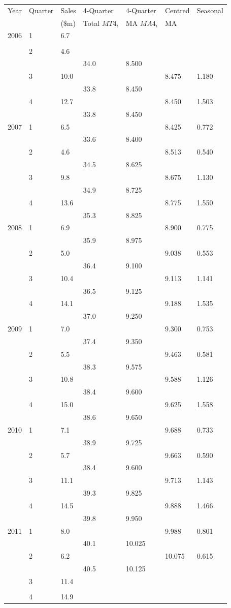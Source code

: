 \documentclass[12pt,a4paper,openany,twoside]{report}
\theoremstyle{definition}
\theoremstyle{remark}
\theoremstyle{plain}
\newcommand{\vsps}{\vspace{.5cm}}
\theoremstyle{definition}
\theoremstyle{definition}
\theoremstyle{definition}
\theoremstyle{remark}
\begin{document}
\begin{longtable}[c]{@{}lllllll@{}}
\label{tb:toys}\\
\toprule
Year & Quarter & Sales & 4-Quarter & 4-Quarter & Centred & Seasonal \tabularnewline
 &  & (\$m) & Total $MT4_i$ & MA $MA4_i$ & MA &  \tabularnewline
\midrule
\endhead
\rowcolor{lightgrey}
2006 & 1 & 6.7 & & & &\tabularnewline
& & & & & &\tabularnewline
\rowcolor{lightgrey}
& 2 & 4.6 & & & &\tabularnewline
& & & 34.0 & 8.500 & &\tabularnewline
\rowcolor{lightgrey}
& 3 & 10.0 & & & 8.475 & 1.180\tabularnewline
& & & 33.8 & 8.450 & &\tabularnewline
\rowcolor{lightgrey}
& 4 & 12.7 & & & 8.450 & 1.503\tabularnewline
& & & 33.8 & 8.450 & &\tabularnewline
\rowcolor{lightgrey}
2007 & 1 & 6.5 & & & 8.425 & 0.772\tabularnewline
& & & 33.6 & 8.400 & &\tabularnewline
\rowcolor{lightgrey}
& 2 & 4.6 & & & 8.513 & 0.540\tabularnewline
& & & 34.5 & 8.625 & &\tabularnewline
\rowcolor{lightgrey}
& 3 & 9.8 & & & 8.675 & 1.130\tabularnewline
& & & 34.9 & 8.725 & &\tabularnewline
\rowcolor{lightgrey}
& 4 & 13.6 & & & 8.775 & 1.550\tabularnewline
& & & 35.3 & 8.825 & &\tabularnewline
\rowcolor{lightgrey}
2008 & 1 & 6.9 & & & 8.900 & 0.775\tabularnewline
& & & 35.9 & 8.975 & &\tabularnewline
\rowcolor{lightgrey}
& 2 & 5.0 & & & 9.038 & 0.553\tabularnewline
& & & 36.4 & 9.100 & &\tabularnewline
\rowcolor{lightgrey}
& 3 & 10.4 & & & 9.113 & 1.141\tabularnewline
& & & 36.5 & 9.125 & &\tabularnewline
\rowcolor{lightgrey}
& 4 & 14.1 & & & 9.188 & 1.535\tabularnewline
& & & 37.0 & 9.250 & &\tabularnewline
\rowcolor{lightgrey}
2009 & 1 & 7.0 & & & 9.300 & 0.753\tabularnewline
& & & 37.4 & 9.350 & &\tabularnewline
\rowcolor{lightgrey}
& 2 & 5.5 & & & 9.463 & 0.581\tabularnewline
& & & 38.3 & 9.575 & &\tabularnewline
\rowcolor{lightgrey}
& 3 & 10.8 & & & 9.588 & 1.126\tabularnewline
& & & 38.4 & 9.600 & &\tabularnewline
\rowcolor{lightgrey}
& 4 & 15.0 & & & 9.625 & 1.558\tabularnewline
& & & 38.6 & 9.650 & &\tabularnewline
\rowcolor{lightgrey}
2010 & 1 & 7.1 & & & 9.688 & 0.733\tabularnewline
& & & 38.9 & 9.725 & &\tabularnewline
\rowcolor{lightgrey}
& 2 & 5.7 & & & 9.663 & 0.590\tabularnewline
& & & 38.4 & 9.600 & &\tabularnewline
\rowcolor{lightgrey}
& 3 & 11.1 & & & 9.713 & 1.143\tabularnewline
& & & 39.3 & 9.825 & &\tabularnewline
\rowcolor{lightgrey}
& 4 & 14.5 & & & 9.888 & 1.466\tabularnewline
& & & 39.8 & 9.950 & &\tabularnewline
\rowcolor{lightgrey}
2011 & 1 & 8.0 & & & 9.988 & 0.801\tabularnewline
& & & 40.1 & 10.025 & &\tabularnewline
\rowcolor{lightgrey}
& 2 & 6.2 & & & 10.075 & 0.615\tabularnewline
& & & 40.5 & 10.125 & &\tabularnewline
\rowcolor{lightgrey}
& 3 & 11.4 & & & &\tabularnewline
& & & & & &\tabularnewline
\rowcolor{lightgrey}
& 4 & 14.9 & & & & \tabularnewline
\bottomrule
\end{longtable}
\vsps
\end{document}
